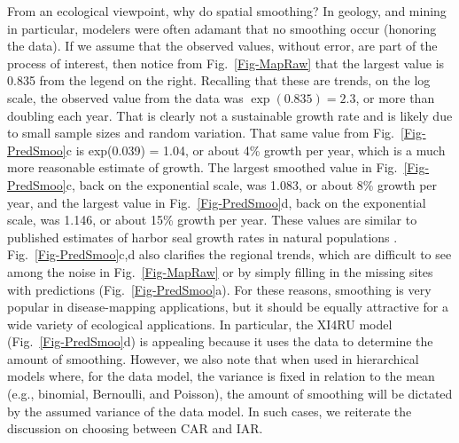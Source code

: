 \documentclass[11pt, titlepage]{article}\usepackage[]{graphicx}\usepackage[]{color}
\begin{document}
\begin{spacing}{1.9}
\begin{flushleft}
From an ecological viewpoint, why do spatial smoothing?  In geology, and mining in particular, modelers were often adamant that no smoothing occur (honoring the data).  If we assume that the observed values, without error, are part of the process of interest, then notice from Fig.~\ref{Fig-MapRaw} that the largest value is 0.835 from the legend on the right.  Recalling that these are trends, on the log scale, the observed value from the data was $\exp(0.835)=2.3$, or more than doubling each year.  That is clearly not a sustainable growth rate and is likely due to small sample sizes and random variation.  That same value from Fig.~\ref{Fig-PredSmoo}c is exp(0.039) = 1.04, or about 4\% growth per year, which is a much more reasonable estimate of growth.  The largest smoothed value in Fig.~\ref{Fig-PredSmoo}c, back on the exponential scale, was 1.083, or about 8\% growth per year, and the largest value in Fig.~\ref{Fig-PredSmoo}d, back on the exponential scale, was 1.146, or about 15\% growth per year. These values are similar to published estimates of harbor seal growth rates in natural populations \citep[e.g.,][]{Hast:Smal:Pend:sex:2012}.  Fig.~\ref{Fig-PredSmoo}c,d also clarifies the regional trends, which are difficult to see among the noise in Fig.~\ref{Fig-MapRaw} or by simply filling in the missing sites with predictions (Fig.~\ref{Fig-PredSmoo}a).  For these reasons, smoothing is very popular in disease-mapping applications, but it should be equally attractive for a wide variety of ecological applications. In particular, the XI4RU model (Fig.~\ref{Fig-PredSmoo}d) is appealing because it uses the data to determine the amount of smoothing.  However, we also note that when used in hierarchical models where, for the data model, the variance is fixed in relation to the mean (e.g., binomial, Bernoulli, and Poisson), the amount of smoothing will be dictated by the assumed variance of the data model.  In such cases, we reiterate the discussion on choosing between CAR and IAR.


\end{flushleft}
\end{spacing}
\end{document}
